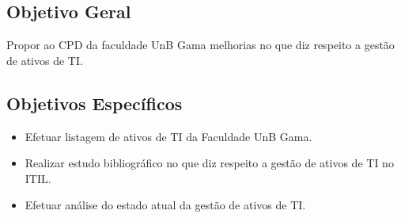 \subsection{Objetivo Geral}
Propor ao CPD da faculdade UnB Gama melhorias no que diz respeito a gestão de ativos de TI.

\subsection{Objetivos Específicos}
\begin{itemize}
\item Efetuar listagem de ativos de TI da Faculdade UnB Gama.
\item Realizar estudo bibliográfico no que diz respeito a gestão de ativos de TI no ITIL.
\item Efetuar análise do estado atual da gestão de ativos de TI.
\end{itemize}